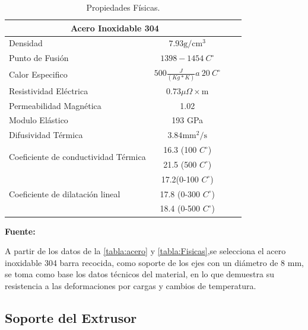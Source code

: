 \begin{table}[H]
\begin{center}
\begin{tabular}{l c c c}
\multicolumn{2}{c}{\textbf{Acero Inoxidable 304}} \\
\toprule[0.6mm]
Densidad& $7.93 \text{g}/ \text{cm}^3$  \\ 
Punto de Fusión& $1398-1454\: C^{\circ}$ \\ 
Calor Especifico & $500\frac{J}{(Kg*K)} a \:20\: C^{\circ}$ \\ 
Resistividad Eléctrica & $0.73\mu \Omega \times \text{m}$ \\ 
Permeabilidad Magnética & 1.02  \\ 
Modulo Elástico & 193 GPa   \\
Difusividad Térmica & $3.84 \text{mm}^2/\text{s}$  \\ 
\midrule
\multirow{2}{5cm}{Coeficiente de conductividad Térmica}& 16.3 (100 $C^{\circ}$)  \\ 
&21.5 (500 $C^{\circ}$)\\
\midrule
\multirow{3}{3cm}{Coeficiente de dilatación lineal}& 17.2(0-100 $C^{\circ}$)\\ 
& 17.8 (0-300 $C^{\circ}$)\\ 
&18.4 (0-500 $C^{\circ}$)\\ 
\bottomrule[0.6mm]
\end{tabular}
\caption{Propiedades Físicas.}
\textbf{Fuente:\citep{acero} }
\label{tabla:Fisicas}
\end{center}
\end{table}



A partir de los datos de la \autoref{tabla:acero} y \autoref{tabla:Fisicas},se selecciona el acero inoxidable 304 barra recocida, como soporte de los ejes con un diámetro de 8 mm, se toma como base los datos técnicos del material, en lo que demuestra su resistencia a las deformaciones por cargas y cambios de temperatura.\\ 


\subsection{Soporte del Extrusor } 

